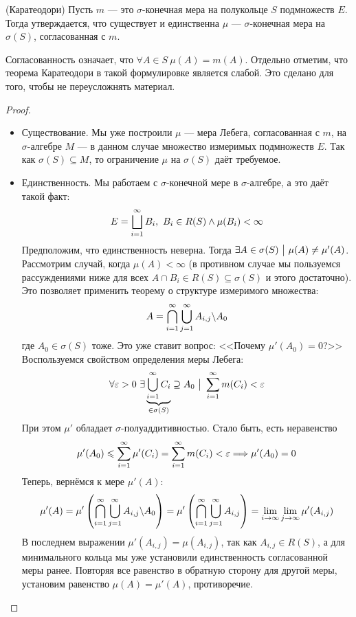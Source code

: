 \begin{theorem} (Каратеодори)
	Пусть $m$ --- это $\sigma$-конечная мера  на полукольце $S$ подмножеств $E$. Тогда утверждается, что существует и единственна $\mu$ --- $\sigma$-конечная мера на $\sigma(S)$, согласованная с $m$.
\end{theorem}

\begin{note}
	Согласованность означает, что $\forall A \in S\ \mu(A) = m(A)$. Отдельно отметим, что теорема Каратеодори в такой формулировке является слабой. Это сделано для того, чтобы не переусложнять материал.
\end{note}

\begin{proof}~
	\begin{itemize}
		\item Существование. Мы уже построили $\mu$ --- мера Лебега, согласованная с $m$, на $\sigma$-алгебре $M$ --- в данном случае множество измеримых подмножеств $E$. Так как $\sigma(S) \subseteq M$, то ограничение $\mu$ на $\sigma(S)$ даёт требуемое.
		
		\item Единственность. Мы работаем с $\sigma$-конечной мере в $\sigma$-алгебре, а это даёт такой факт:
		\[
			E = \bigsqcup_{i = 1}^\infty B_i,\ B_i \in R(S) \wedge \mu(B_i) < \infty
		\]
		Предположим, что единственность неверна. Тогда $\exists A \in \sigma(S) \ \big|\  \mu(A) \neq \mu'(A)$. Рассмотрим случай, когда $\mu(A) < \infty$ (в противном случае мы пользуемся рассуждениями ниже для всех $A \cap B_i \in R(S) \subseteq \sigma(S)$ и этого достаточно). Это позволяет применить теорему о структуре измеримого множества:
		\[
			A = \bigcap_{i = 1}^\infty \bigcup_{j = 1}^\infty A_{i, j} \backslash A_0
		\]
		где $A_0 \in \sigma(S)$ тоже. Это уже ставит вопрос: <<Почему $\mu'(A_0) = 0$?>> Воспользуемся свойством определения меры Лебега:
		\[
			\forall \varepsilon > 0\ \exists \underbrace{\bigcup_{i = 1}^\infty C_i}_{\in \sigma(S)} \supseteq A_0 \ \big|\  \sum_{i = 1}^\infty m(C_i) < \varepsilon
		\]
		При этом $\mu'$ обладает $\sigma$-полуаддитивностью. Стало быть, есть неравенство
		\[
			\mu'(A_0) \leqslant \sum_{i = 1}^\infty \mu'(C_i) = \sum_{i = 1}^\infty m(C_i) < \varepsilon \Longrightarrow \mu'(A_0) = 0
		\]
		Теперь, вернёмся к мере $\mu'(A)$:
		\[
			\mu'(A) = \mu'\left(\bigcap_{i = 1}^\infty \bigcup_{j = 1}^\infty A_{i, j} \backslash A_0\right) = \mu'\left(\bigcap_{i = 1}^\infty \bigcup_{j = 1}^\infty A_{i, j}\right) = \lim_{i \to \infty} \lim_{j \to \infty} \mu'(A_{i, j})
		\]
		В последнем выражении $\mu'(A_{i, j}) = \mu(A_{i, j})$, так как $A_{i, j} \in R(S)$, а для минимального кольца мы уже установили единственность согласованной меры ранее. Повторяя все равенство в обратную сторону для другой меры, установим равенство $\mu(A) = \mu'(A)$, противоречие.
	\end{itemize}
\end{proof}